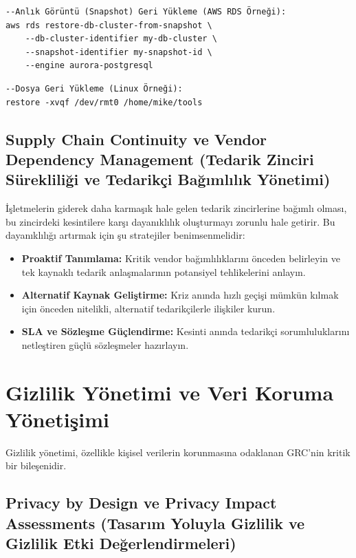 \begin{verbatim}
--Anlık Görüntü (Snapshot) Geri Yükleme (AWS RDS Örneği):
aws rds restore-db-cluster-from-snapshot \
    --db-cluster-identifier my-db-cluster \
    --snapshot-identifier my-snapshot-id \
    --engine aurora-postgresql
\end{verbatim}

\begin{verbatim}
--Dosya Geri Yükleme (Linux Örneği):
restore -xvqf /dev/rmt0 /home/mike/tools
\end{verbatim}

\subsection{Supply Chain Continuity ve Vendor Dependency Management (Tedarik Zinciri Sürekliliği ve Tedarikçi Bağımlılık Yönetimi)}

İşletmelerin giderek daha karmaşık hale gelen tedarik zincirlerine bağımlı olması, bu zincirdeki kesintilere karşı dayanıklılık oluşturmayı zorunlu hale getirir. Bu dayanıklılığı artırmak için şu stratejiler benimsenmelidir:
\begin{itemize}
    \item \textbf{Proaktif Tanımlama:} Kritik vendor bağımlılıklarını önceden belirleyin ve tek kaynaklı tedarik anlaşmalarının potansiyel tehlikelerini anlayın.
    \item \textbf{Alternatif Kaynak Geliştirme:} Kriz anında hızlı geçişi mümkün kılmak için önceden nitelikli, alternatif tedarikçilerle ilişkiler kurun.
    \item \textbf{SLA ve Sözleşme Güçlendirme:} Kesinti anında tedarikçi sorumluluklarını netleştiren güçlü sözleşmeler hazırlayın.
\end{itemize}

\section{Gizlilik Yönetimi ve Veri Koruma Yönetişimi}

Gizlilik yönetimi, özellikle kişisel verilerin korunmasına odaklanan GRC'nin kritik bir bileşenidir.

\subsection{Privacy by Design ve Privacy Impact Assessments (Tasarım Yoluyla Gizlilik ve Gizlilik Etki Değerlendirmeleri)}

